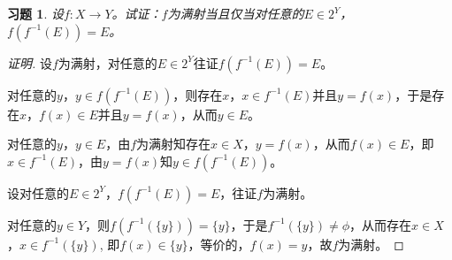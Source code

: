 \documentclass{article}
\begin{document}
\begin{CJK}{UTF8}{gbsn}
\newtheorem*{Ex}{习题}
\begin{Ex}
设$f:X\to Y$。试证：$f$为满射当且仅当对任意的$E\in 2^Y$，$f(f^{-1}(E))=E$。
\end{Ex}
\begin{proof}[证明]
  设$f$为满射，对任意的$E\in 2^Y$往证$f(f^{-1}(E))=E$。

  对任意的$y$，$y\in f(f^{-1}(E))$，则存在$x$，$x\in f^{-1}(E)$并且$y=f(x)$，于是存在$x$，$f(x) \in E$并且$y=f(x)$，从而$y\in E$。

  对任意的$y$，$y\in E$，由$f$为满射知存在$x\in X$，$y=f(x)$，从而$f(x)\in E$，即$x\in f^{-1}(E)$，由$y=f(x)$知$y\in f(f^{-1}(E))$。

  设对任意的$E\in 2^Y$，$f(f^{-1}(E))=E$，往证$f$为满射。

  对任意的$y\in Y$，则$f(f^{-1}(\{y\}))=\{y\}$，于是$f^{-1}(\{y\})\neq \phi$，从而存在$x\in X$，$x\in f^{-1}(\{y\})$, 即$f(x)\in \{y\}$，等价的，$f(x)=y$，故$f$为满射。
\end{proof}
\end{CJK}
\end{document}

